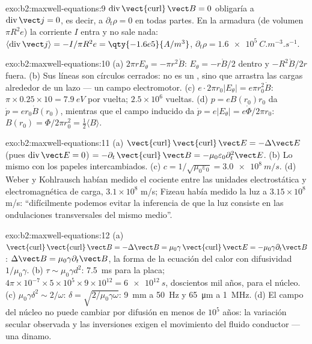 \begin{solution}{exo:b2:maxwell-equations:9}
$\operatorname{div}\operatorname{\vect{curl}}\vect B = 0$ obligaría a $\operatorname{div}\vect j =
0$, es decir, a $\partial_t\rho = 0$ en todas partes. En la armadura (de volumen $\pi R^2e$) la
corriente $I$ entra y no sale nada: $\langle\operatorname{div}\vect j\rangle =
-I/\pi R^2e = \qty{-1.6e5}{A/m^3}$, $\partial_t\rho = \qty{+1.6e5}{C.m^{-3}.s^{-1}}$.
\end{solution}

\begin{solution}{exo:b2:maxwell-equations:10}
(a) $2\pi rE_\theta = -\pi r^2\dot B$: $E_\theta = -r\dot B/2$ dentro y $-R^2\dot B/2r$
fuera. (b) Sus líneas son círculos cerrados: no es un , sino que
arrastra las cargas alrededor de un lazo --- un campo electromotor. (c) $e\cdot2\pi r_0
|E_\theta| = e\pi r_0^2\dot B$: $\pi \times 0.25 \times 10 = \qty{7.9}{eV}$ por vuelta; $2.5 \times 10^6$
vueltas. (d) $p = eB(r_0)r_0$ da $\dot p = er_0\dot B(r_0)$, mientras que el campo
inducido da $\dot p = e|E_\theta| = e\dot\Phi/2\pi r_0$: $B(r_0) = \Phi/2\pi r_0^2 =
\tfrac12\langle B\rangle$.
\end{solution}

\begin{solution}{exo:b2:maxwell-equations:11}
(a) $\operatorname{\vect{curl}}\operatorname{\vect{curl}}\vect E = -\Delta\vect E$ (pues $\operatorname{div}
\vect E = 0$) $= -\partial_t\operatorname{\vect{curl}}\vect B = -\mu_0\varepsilon_0\partial_t^2\vect E$. (b)
Lo mismo con los papeles intercambiados. (c) $c = 1/\sqrt{\mu_0\varepsilon_0} = \qty{3.0e8}{m/s}$.
(d) Weber y Kohlrausch habían medido el cociente entre las unidades
electrostática y electromagnética de carga, $3.1 \times 10^8$ m/s; Fizeau había
medido la luz a $3.15 \times 10^8$ m/s: ``difícilmente podemos evitar la
inferencia de que la luz consiste en las ondulaciones transversales del
mismo medio''.
\end{solution}

\begin{solution}{exo:b2:maxwell-equations:12}
(a) $\operatorname{\vect{curl}}\operatorname{\vect{curl}}\vect B = -\Delta\vect B = \mu_0\gamma\operatorname{\vect{curl}}
\vect E = -\mu_0\gamma\partial_t\vect B$: $\Delta\vect B = \mu_0\gamma\partial_t\vect B$, la forma de la
ecuación del calor con difusividad $1/\mu_0\gamma$. (b) $\tau \sim \mu_0\gamma d^2$: \qty{7.5}{ms}
para la placa; $4\pi \times 10^{-7} \times 5 \times 10^5 \times 9 \times 10^{12} = \qty{6e12}{s}$, doscientos
mil años, para el núcleo. (c) $\mu_0\gamma\delta^2 \sim 2/\omega$: $\delta = \sqrt{2/\mu_0
\gamma\omega}$: \qty{9}{mm} a \qty{50}{Hz} y \qty{65}{\micro m} a \qty{1}{MHz}. (d) El campo
del núcleo no puede cambiar por difusión en menos de $10^5$ años: la
variación secular observada y las inversiones exigen el movimiento del
fluido conductor --- una dinamo.
\end{solution}

